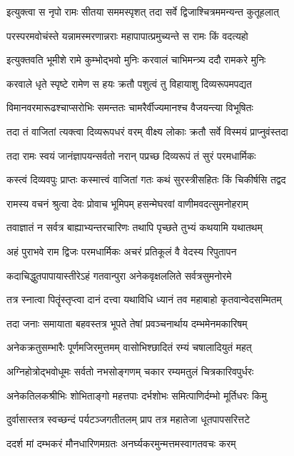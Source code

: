 \twolineshloka
{इत्युक्त्वा स नृपो रामः सीतया सममस्पृशत्}
{तदा सर्वे द्विजाश्चित्रममन्यन्त कुतूहलात्}%

\twolineshloka
{परस्परमवोचंस्ते यन्नामस्मरणान्नराः}
{महापापात्प्रमुच्यन्ते स रामः किं वदत्यहो}%

\twolineshloka
{इत्युक्तवति भूमीशे रामे कुम्भोद्भवो मुनिः}
{करवालं चाभिमन्त्र्य ददौ रामकरे मुनिः}%

\twolineshloka
{करवाले धृते स्पृष्टे रामेण स हयः क्रतौ}
{पशुत्वं तु विहायाशु दिव्यरूपमपद्यत}%

\twolineshloka
{विमानवरमारूढश्चाप्सरोभिः समन्ततः}
{चामरैर्वीज्यमानश्च वैजयन्त्या विभूषितः}%

\twolineshloka
{तदा तं वाजितां त्यक्त्वा दिव्यरूपधरं वरम्}
{वीक्ष्य लोकाः क्रतौ सर्वे विस्मयं प्राप्नुवंस्तदा}%

\twolineshloka
{तदा रामः स्वयं जानंज्ञापयन्सर्वतो नरान्}
{पप्रच्छ दिव्यरूपं तं सुरं परमधार्मिकः}%

\twolineshloka
{कस्त्वं दिव्यवपुः प्राप्तः कस्मात्त्वं वाजितां गतः}
{कथं सुरस्त्रीसहितः किं चिकीर्षसि तद्वद}%

\twolineshloka
{रामस्य वचनं श्रुत्वा देवः प्रोवाच भूमिपम्}
{हसन्मेघरवां वाणीमवदत्सुमनोहराम्}%

\twolineshloka
{तवाज्ञातं न सर्वत्र बाह्याभ्यन्तरचारिणः}
{तथापि पृच्छते तुभ्यं कथयामि यथातथम्}%

\twolineshloka
{अहं पुराभवे राम द्विजः परमधार्मिकः}
{अचरं प्रतिकूलं वै वेदस्य रिपुतापन}%

\twolineshloka
{कदाचिद्धुतपापायास्तीरेऽहं गतवान्पुरा}
{अनेकवृक्षललिते सर्वत्रसुमनोरमे}%

\twolineshloka
{तत्र स्नात्वा पितॄंस्तृप्त्वा दानं दत्त्वा यथाविधि}
{ध्यानं तव महाबाहो कृतवान्वेदसम्मितम्}%

\twolineshloka
{तदा जनाः समायाता बहवस्तत्र भूपते}
{तेषां प्रवञ्चनार्थाय दम्भमेनमकारिषम्}%

\twolineshloka
{अनेकक्रतुसम्भारैः पूर्णमजिरमुत्तमम्}
{वासोभिश्छादितं रम्यं चषालादियुतं महत्}%

\twolineshloka
{अग्निहोत्रोद्भवोधूमः सर्वतो नभसोङ्गणम्}
{चकार रम्यमतुलं चित्रकारिवपुर्धरः}%

\twolineshloka
{अनेकतिलकश्रीभिः शोभिताङ्गो महत्तपाः}
{दर्भशोभः समित्पाणिर्दम्भो मूर्तिधरः किमु}%

\twolineshloka
{दुर्वासास्तत्र स्वच्छन्दं पर्यटञ्जगतीतलम्}
{प्राप तत्र महातेजा धूतपापसरित्तटे}%

\twolineshloka
{ददर्श मां दम्भकरं मौनधारिणमग्रतः}
{अनर्घ्यकरमुन्मत्तमस्वागतवचः करम्}%

